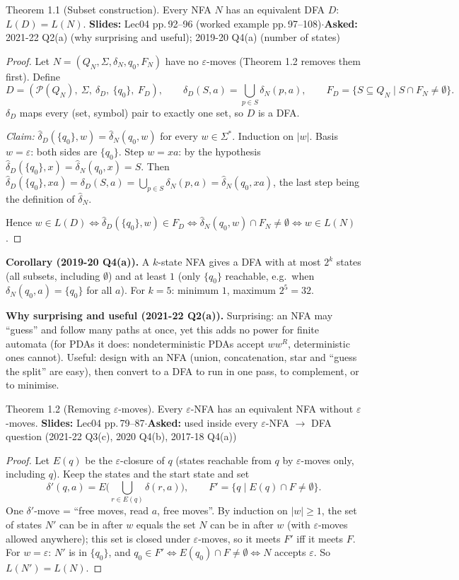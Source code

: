 \documentclass[10.5pt,a4paper]{article}
\newcommand{\src}[2]{{\footnotesize\color{gray!70!black}\textbf{Slides:} #1\enspace$\cdot$\enspace\textbf{Asked:} #2}\par}
\newcommand{\eps}{\varepsilon}
\newcommand{\dhat}{\hat{\delta}}
\begin{document}
\begin{thm}{Theorem 1.1 (Subset construction). Every NFA $N$ has an equivalent DFA $D$: $L(D)=L(N)$.}
\src{Lec04 pp.\,92--96 (worked example pp.\,97--108)}{2021-22 Q2(a) (why surprising and useful); 2019-20 Q4(a) (number of states)}
\end{thm}
\begin{proof}
Let $N=(Q_N,\Sigma,\delta_N,q_0,F_N)$ have no $\eps$-moves (Theorem 1.2 removes them first). Define
\[
D=(\mathcal P(Q_N),\ \Sigma,\ \delta_D,\ \{q_0\},\ F_D),\qquad
\delta_D(S,a)=\bigcup_{p\in S}\delta_N(p,a),\qquad
F_D=\{S\subseteq Q_N \mid S\cap F_N\neq\emptyset\}.
\]
$\delta_D$ maps every (set, symbol) pair to exactly one set, so $D$ is a DFA.

\emph{Claim:} $\dhat_D(\{q_0\},w)=\dhat_N(q_0,w)$ for every $w\in\Sigma^*$. Induction on $|w|$.
Basis $w=\eps$: both sides are $\{q_0\}$.
Step $w=xa$: by the hypothesis $\dhat_D(\{q_0\},x)=\dhat_N(q_0,x)=S$. Then
$\dhat_D(\{q_0\},xa)=\delta_D(S,a)=\bigcup_{p\in S}\delta_N(p,a)=\dhat_N(q_0,xa)$, the last step being the definition of $\dhat_N$.

Hence $w\in L(D)\iff \dhat_D(\{q_0\},w)\in F_D\iff \dhat_N(q_0,w)\cap F_N\ne\emptyset\iff w\in L(N)$.
\end{proof}
\textbf{Corollary (2019-20 Q4(a)).} A $k$-state NFA gives a DFA with at most $2^k$ states (all subsets, including $\emptyset$) and at least $1$
(only $\{q_0\}$ reachable, e.g.\ when $\delta_N(q_0,a)=\{q_0\}$ for all $a$). For $k=5$: minimum $1$, maximum $2^5=32$.

\textbf{Why surprising and useful (2021-22 Q2(a)).} Surprising: an NFA may ``guess'' and follow many paths at once, yet this adds no power for
finite automata (for PDAs it does: nondeterministic PDAs accept $ww^R$, deterministic ones cannot). Useful: design with an NFA (union,
concatenation, star and ``guess the split'' are easy), then convert to a DFA to run in one pass, to complement, or to minimise.

\begin{thm}{Theorem 1.2 (Removing $\eps$-moves). Every $\eps$-NFA has an equivalent NFA without $\eps$-moves.}
\src{Lec04 pp.\,79--87}{used inside every $\eps$-NFA $\to$ DFA question (2021-22 Q3(c), 2020 Q4(b), 2017-18 Q4(a))}
\end{thm}
\begin{proof}
Let $E(q)$ be the $\eps$-closure of $q$ (states reachable from $q$ by $\eps$-moves only, including $q$). Keep the states and the start
state and set
\[\delta'(q,a)=E\Big(\bigcup_{r\in E(q)}\delta(r,a)\Big),\qquad F'=\{q\mid E(q)\cap F\ne\emptyset\}.\]
One $\delta'$-move = ``free moves, read $a$, free moves''. By induction on $|w|\ge1$, the set of states $N'$ can be in after $w$ equals the
set $N$ can be in after $w$ (with $\eps$-moves allowed anywhere); this set is closed under $\eps$-moves, so it meets $F'$ iff it meets $F$.
For $w=\eps$: $N'$ is in $\{q_0\}$, and $q_0\in F'\iff E(q_0)\cap F\neq\emptyset\iff N$ accepts $\eps$. So $L(N')=L(N)$.
\end{proof}
\end{document}
